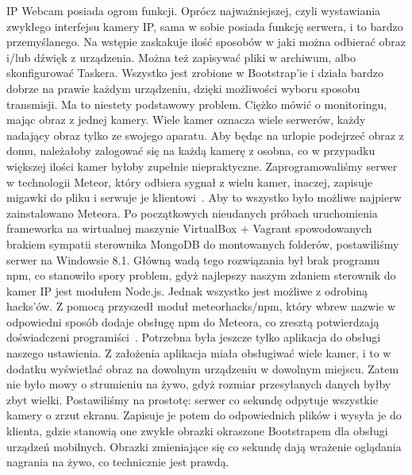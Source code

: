 \documentclass[brudnopis]{xmgr}
\begin{document}
IP Webcam posiada ogrom funkcji. Oprócz najważniejszej, czyli wystawiania zwykłego interfejsu kamery IP, sama w sobie posiada funkcję serwera, i to bardzo przemyślanego. Na wstępie zaskakuje ilość sposobów w jaki można odbierać obraz i/lub dźwięk z urządzenia. Można też zapisywać pliki w archiwum, albo skonfigurować Taskera. Wszystko jest zrobione w Bootstrap'ie i działa bardzo dobrze na prawie każdym urządzeniu, dzięki możliwości wyboru sposobu transmisji.
Ma to niestety podstawowy problem. Ciężko mówić o monitoringu, mając obraz z jednej kamery. Wiele kamer oznacza wiele serwerów, każdy nadający obraz tylko ze swojego aparatu. Aby będąc na urlopie podejrzeć obraz z domu, należałoby zalogować się na każdą kamerę z osobna, co w przypadku większej ilości kamer byłoby zupełnie niepraktyczne. Zaprogramowaliśmy serwer w technologii Meteor, który odbiera sygnał z wielu kamer, inaczej, zapisuje migawki do pliku i serwuje je klientowi~\cite{Started}.
Aby to wszystko było możliwe najpierw zainstalowano Meteora. Po początkowych nieudanych próbach uruchomienia frameworka na wirtualnej maszynie VirtualBox + Vagrant spowodowanych brakiem sympatii sterownika MongoDB do montowanych folderów, postawiliśmy serwer na Windowsie 8.1. Główną wadą tego rozwiązania był brak programu npm, co stanowiło spory problem, gdyż najlepszy naszym zdaniem sterownik do kamer IP jest modułem Node.js. Jednak wszystko jest możliwe z odrobiną hacks'ów. Z pomocą przyszedł moduł meteorhacks/npm, który wbrew nazwie w odpowiedni sposób dodaje obsługę npm do Meteora, co zresztą potwierdzają doświadczeni programiści~\cite{Npm:2014:CMC}.
Potrzebna była jeszcze tylko aplikacja do obsługi naszego ustawienia. Z założenia aplikacja miała obsługiwać wiele kamer, i to w dodatku wyświetlać obraz na dowolnym urządzeniu w dowolnym miejscu. Zatem nie było mowy o strumieniu na żywo, gdyż rozmiar przesyłanych danych byłby zbyt wielki. Postawiliśmy na prostotę: serwer co sekundę odpytuje wszystkie kamery o zrzut ekranu. Zapisuje je potem do odpowiednich plików i wysyła je do klienta, gdzie stanowią one zwykłe obrazki okraszone Bootstrapem dla obsługi urządzeń mobilnych. Obrazki zmieniające się co sekundę dają wrażenie oglądania nagrania na żywo, co technicznie jest prawdą.
\end{document}
